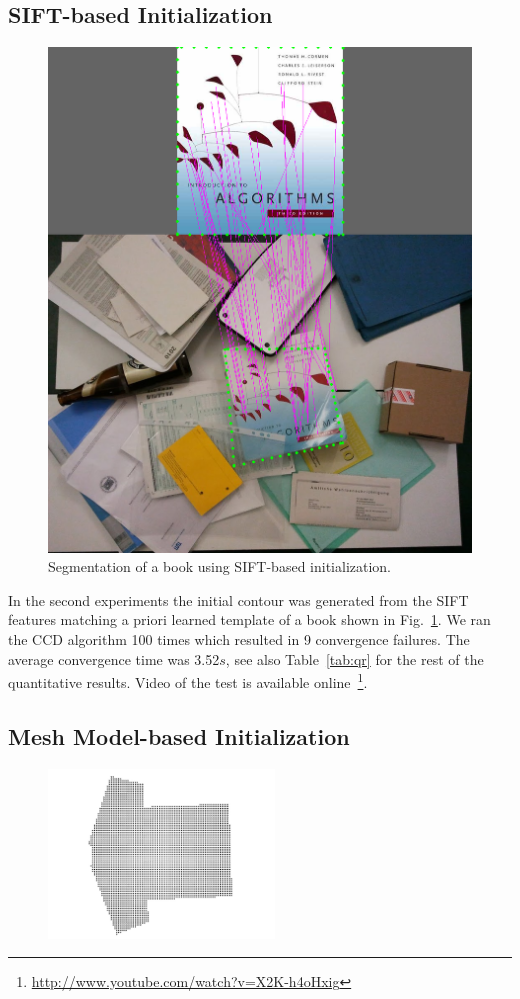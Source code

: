 \documentclass[conference]{IEEEtran}
\begin{document}
\subsection{SIFT-based Initialization}
\label{sec:sift_init}
\begin{figure}[htbp]
  \centering
  \includegraphics[width=0.8\columnwidth]{experiments/book_sift/sift_result.png}
  \caption{Segmentation of a book using SIFT-based initialization.}
  \label{fig:sift_result}
\end{figure}

In the second experiments  the initial contour was generated from the SIFT features 
matching a priori learned template of a book shown in Fig.~\ref{fig:sift_result}. 
We ran the CCD algorithm 100 times which resulted in 9 convergence failures. 
The average convergence time was 3.52$s$, see also Table~\ref{tab:qr} for the rest
of the quantitative results. Video of the test is available online~\footnote{\url{http://www.youtube.com/watch?v=X2K-h4oHxig}}.

\subsection{Mesh Model-based Initialization}
\label{sec:tifpc}
\begin{figure}[h!]
  \centering
  \includegraphics[width=6cm]{experiments/tshirt/tshirt_pcd.jpg}
\end{figure}
\end{document}
